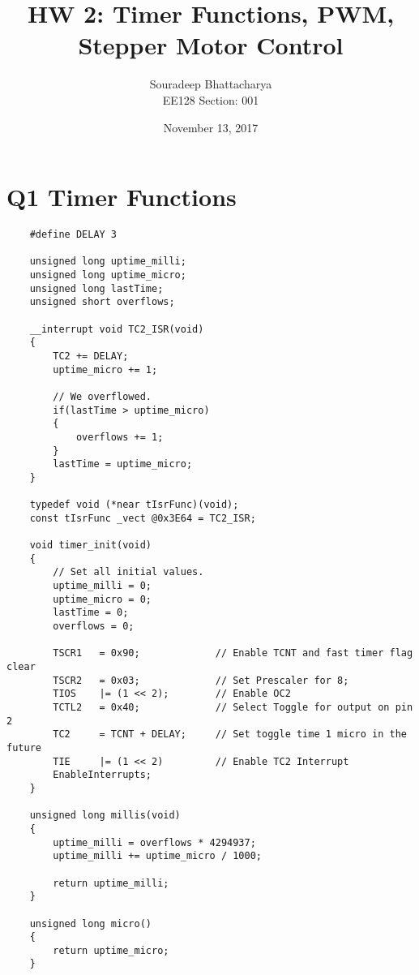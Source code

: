 \documentclass{article}
\title{HW 2: Timer Functions, PWM, Stepper Motor Control}
\date{November 13, 2017}
\author{Souradeep Bhattacharya \\ EE128 Section: 001}
\begin{document}
	\maketitle
	\section*{Q1 Timer Functions}
	\begin{lstlisting}
	#define DELAY 3
	
	unsigned long uptime_milli;
	unsigned long uptime_micro;
	unsigned long lastTime;
	unsigned short overflows;
	
	__interrupt void TC2_ISR(void)
	{
		TC2 += DELAY; 
		uptime_micro += 1;
		
		// We overflowed.
		if(lastTime > uptime_micro)
		{
			overflows += 1;
		}
		lastTime = uptime_micro;
	}
	
	typedef void (*near tIsrFunc)(void);
	const tIsrFunc _vect @0x3E64 = TC2_ISR;
	
	void timer_init(void)
	{
		// Set all initial values.
		uptime_milli = 0;
		uptime_micro = 0;
		lastTime = 0;
		overflows = 0;
			
		TSCR1	= 0x90;				// Enable TCNT and fast timer flag clear
		TSCR2	= 0x03;				// Set Prescaler for 8;
		TIOS	|= (1 << 2);		// Enable OC2
		TCTL2	= 0x40;				// Select Toggle for output on pin 2
		TC2		= TCNT + DELAY; 	// Set toggle time 1 micro in the future
		TIE		|= (1 << 2) 		// Enable TC2 Interrupt
		EnableInterrupts;
	}
	
	unsigned long millis(void)
	{
		uptime_milli = overflows * 4294937;
		uptime_milli += uptime_micro / 1000;
		
		return uptime_milli;
	}
	
	unsigned long micro()
	{
		return uptime_micro;
	}
	
	\end{lstlisting}
	
\end{document}

